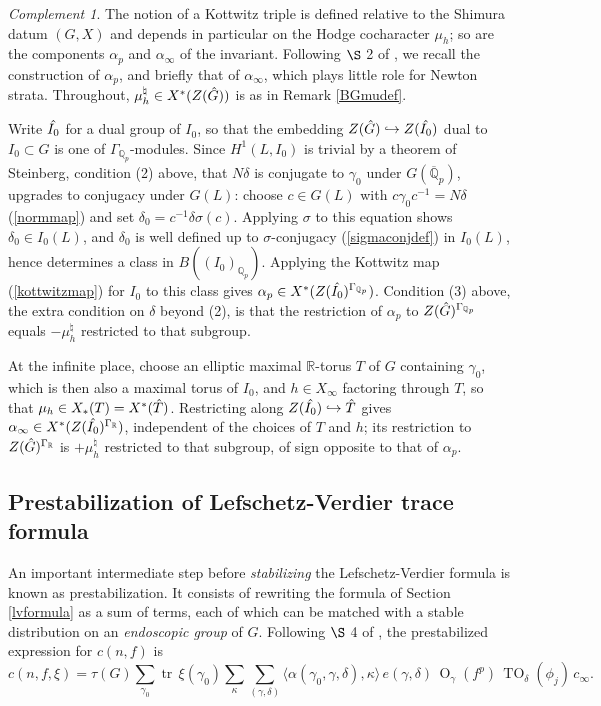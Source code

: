 \documentclass[11pt,a4paper]{article}
\theoremstyle{definition}
\theoremstyle{plain}
\theoremstyle{remark}
\newtheorem{Rc}[shared]{Complement}
\theoremstyle{plain}
\DeclareMathOperator{\tr}{tr}
\DeclareMathOperator{\Or}{O}
\DeclareMathOperator{\TO}{TO}
\begin{document}
\begin{Rc}\label{kottwitztripledetails}
    The notion of a Kottwitz triple is defined relative to the Shimura datum $(G,X)$ and depends in particular on the Hodge cocharacter $\mu_h$; so are the components $\alpha_p$ and $\alpha_{\infty}$ of the invariant. Following $\S$ 2 of \cite{MR1044820}, we recall the construction of $\alpha_p$, and briefly that of $\alpha_{\infty}$, which plays little role for Newton strata. Throughout, $\mu_h^{\natural} \in X^*(Z(\Hat{G}))$ is as in Remark \ref{BGmudef}.

    Write $\Hat{I_0}$ for a dual group of $I_0$, so that the embedding $Z(\Hat{G}) \hookrightarrow Z(\Hat{I_0})$ dual to $I_0 \subset G$ is one of $\Gamma_{\mathbb{Q}_p}$-modules. Since $H^1(L, I_0)$ is trivial by a theorem of Steinberg, condition (2) above, that $N\delta$ is conjugate to $\gamma_0$ under $G(\overline{\mathbb{Q}}_p)$, upgrades to conjugacy under $G(L)$: choose $c \in G(L)$ with $c \gamma_0 c^{-1} = N\delta$ (\ref{normmap}) and set $\delta_0 = c^{-1} \delta \sigma(c)$. Applying $\sigma$ to this equation shows $\delta_0 \in I_0(L)$, and $\delta_0$ is well defined up to $\sigma$-conjugacy (\ref{sigmaconjdef}) in $I_0(L)$, hence determines a class in $B((I_0)_{\mathbb{Q}_p})$. Applying the Kottwitz map (\ref{kottwitzmap}) for $I_0$ to this class gives $\alpha_p \in X^*(Z(\Hat{I_0})^{\Gamma_{\mathbb{Q}_p}})$. Condition (3) above, the extra condition on $\delta$ beyond (2), is that the restriction of $\alpha_p$ to $Z(\Hat{G})^{\Gamma_{\mathbb{Q}_p}}$ equals $-\mu_h^{\natural}$ restricted to that subgroup.

    At the infinite place, choose an elliptic maximal $\mathbb{R}$-torus $T$ of $G$ containing $\gamma_0$, which is then also a maximal torus of $I_0$, and $h \in X_{\infty}$ factoring through $T$, so that $\mu_h \in X_*(T) = X^*(\Hat{T})$. Restricting along $Z(\Hat{I_0}) \hookrightarrow \Hat{T}$ gives $\alpha_{\infty} \in X^*(Z(\Hat{I_0})^{\Gamma_{\mathbb{R}}})$, independent of the choices of $T$ and $h$; its restriction to $Z(\Hat{G})^{\Gamma_{\mathbb{R}}}$ is $+\mu_h^{\natural}$ restricted to that subgroup, of sign opposite to that of $\alpha_p$.
\end{Rc}

\subsection{Prestabilization of Lefschetz-Verdier trace formula}\label{prestab}
An important intermediate step before \textit{stabilizing} the Lefschetz-Verdier formula is known as prestabilization. It consists of rewriting the formula of Section \ref{lvformula} as a sum of terms, each of which can be matched with a stable distribution on an \textit{endoscopic group} of $G$. Following $\S$ 4 of \cite{MR1044820}, the prestabilized expression for $c(n,f)$ is
$$
    c(n,f,\xi) = \tau(G) \sum_{\gamma_0} \tr\,\xi(\gamma_0) \sum_{\kappa} \sum_{(\gamma, \delta)} \langle \alpha(\gamma_0, \gamma, \delta), \kappa \rangle \, e(\gamma, \delta) \, \Or_\gamma (f^p) \, \TO_{\delta} (\phi_j) \, c_{\infty}.
$$
\end{document}
